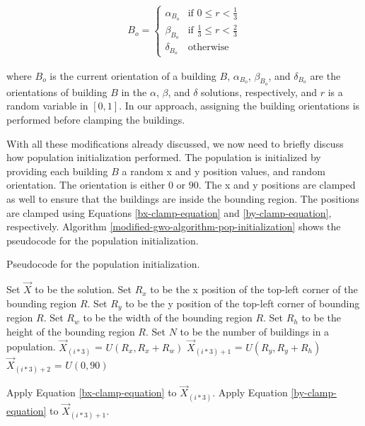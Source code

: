 \begin{align}
	B_{o} = \left\{\begin{matrix}
		\alpha_{B_{o}} & \text{if } 0 \leq r < \frac{1}{3} \\ 
		\beta_{B_{o}}  & \text{if } \frac{1}{3} \leq r < \frac{2}{3}  \\ 
		\delta_{B_{o}} & \text{otherwise}
	\end{matrix}\right.
	\label{modified-gwo-bo}
\end{align}

where $B_{o}$ is the current orientation of a building $B$, $\alpha_{B_{o}}$, $\beta_{B_{o}}$, and $\delta_{B_{o}}$ are the orientations of building $B$ in the $\alpha$, $\beta$, and $\delta$ solutions, respectively, and $r$ is a random variable in $[0, 1]$. In our approach, assigning the building orientations is performed before clamping the buildings.

With all these modifications already discussed, we now need to briefly discuss how population initialization performed. The population is initialized by providing each building $B$ a random x and y position values, and random orientation. The orientation is either $0$ or $90$. The x and y positions are clamped as well to ensure that the buildings are inside the bounding region. The positions are clamped using Equations \ref{bx-clamp-equation} and \ref{by-clamp-equation}, respectively. Algorithm \ref{modified-gwo-algorithm-pop-initialization} shows the pseudocode for the population initialization.

\begin{algorithm}[h!]
\caption{Pseudocode for the population initialization.}
\label{modified-gwo-algorithm-pop-initialization}
\begin{algorithmic}[1]
\State Set $\vec{X}$ to be the solution.
\State Set $R_{x}$ to be the x position of the top-left corner of the bounding region $R$.
\State Set $R_{y}$ to be the y position of the top-left corner of bounding region $R$.
\State Set $R_{w}$ to be the width of the bounding region $R$.
\State Set $R_{h}$ to be the height of the bounding region $R$.
\State Set $N$ to be the number of buildings in a population.
	\State $\vec{X}_{(i * 3)}$ = $U(R_{x}, R_{x} + R_{w})$
	\State $\vec{X}_{(i * 3) + 1}$ = $U(R_{y}, R_{y} + R_{h})$
	\State $\vec{X}_{(i * 3) + 2}$ = $U({0, 90})$
	
	\State Apply Equation \ref{bx-clamp-equation} to $\vec{X}_{(i * 3)}$.
	\State Apply Equation \ref{by-clamp-equation} to $\vec{X}_{(i * 3) + 1}$.
\EndFor
\end{algorithmic}
\end{algorithm}

